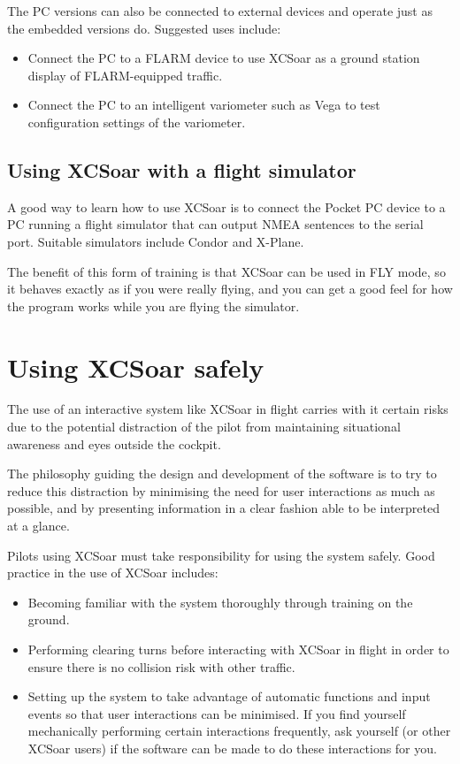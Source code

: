 The PC versions can also be connected to external devices and operate just as
the embedded versions do. Suggested uses include:
\begin{itemize}
\item Connect the PC to a FLARM device to use XCSoar as a ground
station display of FLARM-equipped traffic.
\item Connect the PC to an intelligent variometer such as Vega to
test configuration settings of the variometer.
\end{itemize}

\subsection*{Using XCSoar with a flight simulator}
A good way to learn how to use XCSoar is to connect the Pocket PC
device to a PC running a flight simulator that can output NMEA
sentences to the serial port. Suitable simulators include Condor and
X-Plane.  

The benefit of this form of training is that XCSoar can be used in FLY
mode, so it behaves exactly as if you were really flying, and you can
get a good feel for how the program works while you are flying the
simulator.

\section{Using XCSoar safely}\label{sec:usingxcsoarsafely}\label{conf:usingxcsoarsafely}
The use of an interactive system like XCSoar in flight carries with it
certain risks due to the potential distraction of the pilot from
maintaining situational awareness and eyes outside the cockpit.

The philosophy guiding the design and development of the software is
to try to reduce this distraction by minimising the need for user
interactions as much as possible, and by presenting information in a
clear fashion able to be interpreted at a glance.

Pilots using XCSoar must take responsibility for using the system safely.
Good practice in the use of XCSoar includes:
\begin{itemize}
\item Becoming familiar with the system thoroughly through training on 
  the ground.
\item Performing clearing turns before interacting with XCSoar in flight
  in order to ensure there is no collision risk with other traffic.
\item Setting up the system to take advantage of automatic functions
  and input events so that user interactions can be minimised.  If you
  find yourself mechanically performing certain interactions frequently,
  ask yourself (or other XCSoar users) if the software can be made to do 
  these interactions for you.
\end{itemize}
